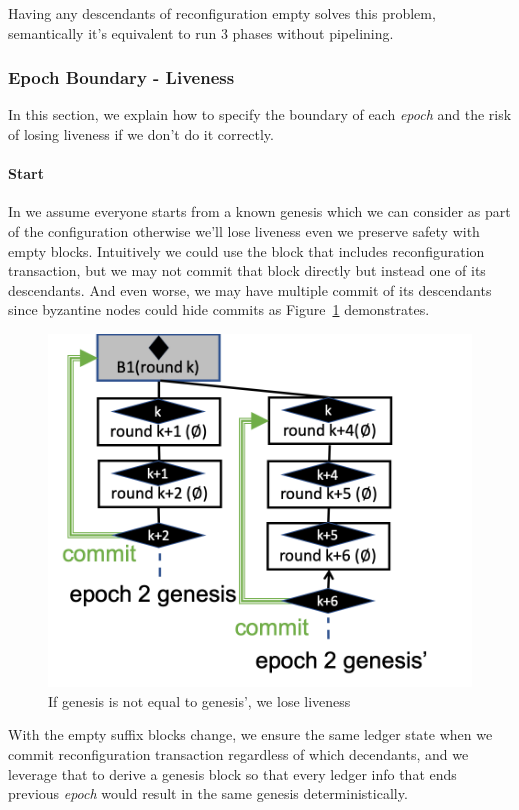 Having any descendants of reconfiguration empty solves this problem, semantically it's equivalent to run 3 phases without
pipelining.

\subsubsection{Epoch Boundary - Liveness}
In this section, we explain how to specify the boundary of each \emph{epoch} and the risk of losing liveness if we don't do it correctly.
\paragraph{Start}
In \LBFT we assume everyone starts from a known genesis which we can consider as part of the configuration otherwise we'll lose liveness
even we preserve safety with empty blocks.
Intuitively we could use the block that includes reconfiguration transaction, but we may not commit that block directly but instead one
 of its descendants. And even worse, we may have multiple commit of its descendants since byzantine nodes could hide commits as Figure~\ref{fig:liveness}
 demonstrates.

\begin{figure}[ht]
	\centering
\includegraphics[scale=.45]{figures/reconfig-liveness.png}
\caption{If genesis is not equal to genesis', we lose liveness}
\label{fig:liveness}
\end{figure}

With the empty suffix blocks change, we ensure the same ledger state when we commit reconfiguration transaction regardless of which decendants,
and we leverage that to derive a genesis block so that every ledger info that ends previous \emph{epoch} would result in the same genesis deterministically.

